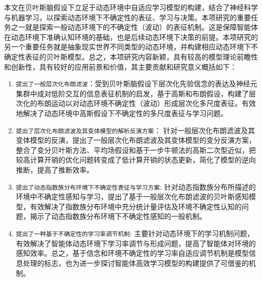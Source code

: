 本文在贝叶斯脑假设下立足于动态环境中自适应学习模型的构建，结合了神经科学与机器学习，以探索动态环境下不确定性的表征、学习与决策。本项研究的重要任务之一就是探索一般动态环境下的不确定性（波动）的表征机制。这是保障智能体在动态环境下准确认知环境的基础，也是后续动态环境下决策的前提。本项研究的另一个重要任务就是抽象现实世界不同类型的动态环境，并构建相应动态环境下不确定性表征的贝叶斯模型。总之，本项研究内容新颖，具有较高的模型理论前瞻性和创新性，具有较好的应用前景和价值，其主要贡献和研究意义概括如下：
\begin{enumerate}
	\item {\verb|提出了一般层次化布朗滤波|}：受到贝叶斯脑假设下层次化先验信念的表达及神经元集群中成对低阶交互的信息表征机制的启发，基于高斯和布朗假设，构建了层次化的布朗运动以对动态环境不确定性（波动）形成层次化多尺度表征。有效地解决了动态环境中高斯假设下不确定性的多尺度表征与学习问题。
	
	\item {\verb|提出了层次化布朗滤波及其变体模型的解析反演方案|}： 针对一般层次化布朗滤波及其变体模型的反演，提出了一般层次化布朗滤波及其变体模型的变分反演方案， 整合了变分贝叶斯方法、平均场假设和基于一步牛顿法的高斯二次型近似，把较高计算开销的优化问题转变成了低计算开销的状态更新，简化了模型的逆向推断，提高了推断效率。
	
	\item {\verb|提出了动态指数族分布环境下不确定性表征与学习方案|}: 针对动态指数族分布所描述的环境中不确定性感知与学习，提出了基于一般层次化布朗滤波的贝叶斯感知模型，有效解决了指数族分布环境中充分统计量评估及环境不确定性认知的问题，揭示了动态指数族分布环境下不确定性感知的一般机制。
	
	\item {\verb|提出了一种基于不确定性的学习率调节机制|}: 主要针对动态环境下的学习机制问题，有效解决了智能体动态环境下学习率调节与形成问题，提高了智能体对环境的感知效率。总之，基于信念和环境不确定性的学习率自适应调节机制是模型信息处理的标志，也为进一步探讨智能体高效学习模型的构建提供了可借鉴的机制。
	

\end{enumerate}
